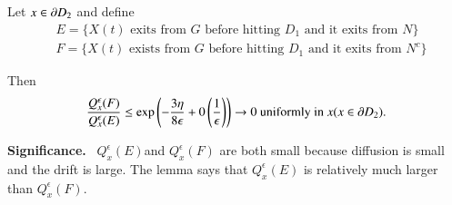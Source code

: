 \begin{lemma*}
Let $x\in \partial D_{2}$ and define
\begin{align*}
& E=\{X(t)\text{~exits from $G$ before hitting $D_{1}$ and it exits from
  $N$}\}\\
& F=\{X(t)\text{~exists from $G$ before hitting $D_{1}$ and it exits
    from $N^{c}$}\}
\end{align*}

Then
$$
\frac{Q^{\epsilon}_{x}(F)}{Q^{\epsilon}_{x}(E)}\leq \exp
\left(-\frac{3\eta}{8\epsilon}+0\left(\frac{1}{\epsilon}\right)\right)\to
0\text{~ uniformly in~ } x(x\in \partial D_{2}).
$$
\end{lemma*}

\noindent
{\bf Significance.}~ $Q^{\epsilon}_{x}(E)$\pageoriginale and $Q^{\epsilon}_{x}(F)$
are both small because diffusion is small and the drift is large. The
lemma says that $Q^{\epsilon}_{x}(E)$ is relatively much larger than
$Q^{\epsilon}_{x}(F)$. 

